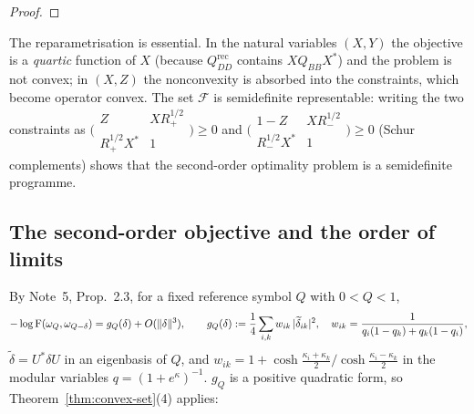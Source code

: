 \documentclass[11pt]{article}
\begin{document}
\begin{proof}
\end{proof}

\begin{remark}
The reparametrisation is essential.  In the natural variables \((X,Y)\) the
objective is a \emph{quartic} function of \(X\) (because \(Q^{\mathrm{rec}}_{DD}\)
contains \(XQ_{BB}X^*\)) and the problem is not convex; in \((X,Z)\) the
nonconvexity is absorbed into the constraints, which become operator convex.
The set \(\mathcal F\) is semidefinite representable: writing the two constraints
as \(\bigl(\begin{smallmatrix}Z&XR_+^{1/2}\\ R_+^{1/2}X^*&1\end{smallmatrix}\bigr)\ge0\)
and \(\bigl(\begin{smallmatrix}1-Z&XR_-^{1/2}\\ R_-^{1/2}X^*&1\end{smallmatrix}\bigr)\ge0\)
(Schur complements) shows that the second-order optimality problem is a
semidefinite programme.
\end{remark}

\subsection{The second-order objective and the order of limits}\label{sec:order}

By Note~5, Prop.~2.3, for a fixed reference symbol \(Q\) with \(0<Q<1\),
\begin{equation}\label{eq:gQ}
 -\log\operatorname{F}(\omega_Q,\omega_{Q-\delta})=g_Q(\delta)+O(\|\delta\|^3),\qquad
 g_Q(\delta):=\frac14\sum_{i,k}w_{ik}\,|\widetilde\delta_{ik}|^2,\quad
 w_{ik}=\frac{1}{q_i(1-q_k)+q_k(1-q_i)},
\end{equation}
\(\widetilde\delta=U^*\delta U\) in an eigenbasis of \(Q\), and
\(w_{ik}=1+\cosh\frac{\kappa_i+\kappa_k}2/\cosh\frac{\kappa_i-\kappa_k}2\) in the
modular variables \(q=(1+e^\kappa)^{-1}\).  \(g_Q\) is a positive quadratic form,
so Theorem~\ref{thm:convex-set}(4) applies:
\end{document}
